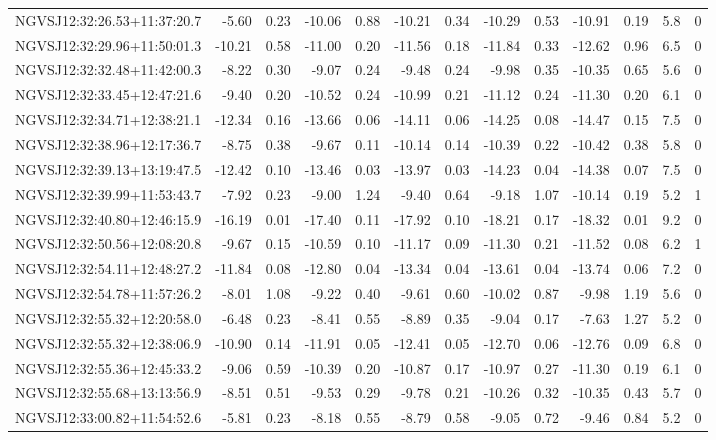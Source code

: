 \begin{tabular}{lrrrrrrrrrrcc}
NGVSJ12:32:26.53+11:37:20.7 & -5.60 & 0.23 & -10.06 & 0.88 & -10.21 & 0.34 & -10.29 & 0.53 & -10.91 & 0.19 & 5.8 & 0 \\
NGVSJ12:32:29.96+11:50:01.3 & -10.21 & 0.58 & -11.00 & 0.20 & -11.56 & 0.18 & -11.84 & 0.33 & -12.62 & 0.96 & 6.5 & 0 \\
NGVSJ12:32:32.48+11:42:00.3 & -8.22 & 0.30 & -9.07 & 0.24 & -9.48 & 0.24 & -9.98 & 0.35 & -10.35 & 0.65 & 5.6 & 0 \\
NGVSJ12:32:33.45+12:47:21.6 & -9.40 & 0.20 & -10.52 & 0.24 & -10.99 & 0.21 & -11.12 & 0.24 & -11.30 & 0.20 & 6.1 & 0 \\
NGVSJ12:32:34.71+12:38:21.1 & -12.34 & 0.16 & -13.66 & 0.06 & -14.11 & 0.06 & -14.25 & 0.08 & -14.47 & 0.15 & 7.5 & 0 \\
NGVSJ12:32:38.96+12:17:36.7 & -8.75 & 0.38 & -9.67 & 0.11 & -10.14 & 0.14 & -10.39 & 0.22 & -10.42 & 0.38 & 5.8 & 0 \\
NGVSJ12:32:39.13+13:19:47.5 & -12.42 & 0.10 & -13.46 & 0.03 & -13.97 & 0.03 & -14.23 & 0.04 & -14.38 & 0.07 & 7.5 & 0 \\
NGVSJ12:32:39.99+11:53:43.7 & -7.92 & 0.23 & -9.00 & 1.24 & -9.40 & 0.64 & -9.18 & 1.07 & -10.14 & 0.19 & 5.2 & 1 \\
NGVSJ12:32:40.80+12:46:15.9 & -16.19 & 0.01 & -17.40 & 0.11 & -17.92 & 0.10 & -18.21 & 0.17 & -18.32 & 0.01 & 9.2 & 0 \\
NGVSJ12:32:50.56+12:08:20.8 & -9.67 & 0.15 & -10.59 & 0.10 & -11.17 & 0.09 & -11.30 & 0.21 & -11.52 & 0.08 & 6.2 & 1 \\
NGVSJ12:32:54.11+12:48:27.2 & -11.84 & 0.08 & -12.80 & 0.04 & -13.34 & 0.04 & -13.61 & 0.04 & -13.74 & 0.06 & 7.2 & 0 \\
NGVSJ12:32:54.78+11:57:26.2 & -8.01 & 1.08 & -9.22 & 0.40 & -9.61 & 0.60 & -10.02 & 0.87 & -9.98 & 1.19 & 5.6 & 0 \\
NGVSJ12:32:55.32+12:20:58.0 & -6.48 & 0.23 & -8.41 & 0.55 & -8.89 & 0.35 & -9.04 & 0.17 & -7.63 & 1.27 & 5.2 & 0 \\
NGVSJ12:32:55.32+12:38:06.9 & -10.90 & 0.14 & -11.91 & 0.05 & -12.41 & 0.05 & -12.70 & 0.06 & -12.76 & 0.09 & 6.8 & 0 \\
NGVSJ12:32:55.36+12:45:33.2 & -9.06 & 0.59 & -10.39 & 0.20 & -10.87 & 0.17 & -10.97 & 0.27 & -11.30 & 0.19 & 6.1 & 0 \\
NGVSJ12:32:55.68+13:13:56.9 & -8.51 & 0.51 & -9.53 & 0.29 & -9.78 & 0.21 & -10.26 & 0.32 & -10.35 & 0.43 & 5.7 & 0 \\
NGVSJ12:33:00.82+11:54:52.6 & -5.81 & 0.23 & -8.18 & 0.55 & -8.79 & 0.58 & -9.05 & 0.72 & -9.46 & 0.84 & 5.2 & 0 \\

\end{tabular}

